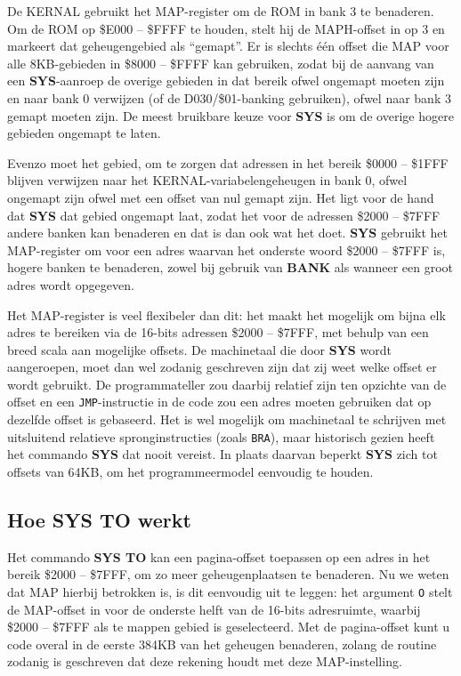 De KERNAL gebruikt het MAP-register om de ROM in bank 3 te benaderen. Om de ROM op \$E000 -- \$FFFF te houden, stelt hij de MAPH-offset in op 3 en markeert dat geheugengebied als ``gemapt''. Er is slechts één offset die MAP voor alle 8KB-gebieden in \$8000 -- \$FFFF kan gebruiken, zodat bij de aanvang van een {\bf SYS}-aanroep de overige gebieden in dat bereik ofwel ongemapt moeten zijn en naar bank 0 verwijzen (of de D030/\$01-banking gebruiken), ofwel naar bank 3 gemapt moeten zijn. De meest bruikbare keuze voor {\bf SYS} is om de overige hogere gebieden ongemapt te laten.

Evenzo moet het gebied, om te zorgen dat adressen in het bereik \$0000 -- \$1FFF blijven verwijzen naar het KERNAL-variabelengeheugen in bank 0, ofwel ongemapt zijn ofwel met een offset van nul gemapt zijn. Het ligt voor de hand dat {\bf SYS} dat gebied ongemapt laat, zodat het voor de adressen \$2000 -- \$7FFF andere banken kan benaderen en dat is dan ook wat het doet. {\bf SYS} gebruikt het MAP-register om voor een adres waarvan het onderste woord \$2000 -- \$7FFF is, hogere banken te benaderen, zowel bij gebruik van {\bf BANK} als wanneer een groot adres wordt opgegeven.

Het MAP-register is veel flexibeler dan dit: het maakt het mogelijk om bijna elk adres te bereiken via de 16-bits adressen \$2000 -- \$7FFF, met behulp van een breed scala aan mogelijke offsets. De machinetaal die door {\bf SYS} wordt aangeroepen, moet dan wel zodanig geschreven zijn dat zij weet welke offset er wordt gebruikt. De programmateller zou daarbij relatief zijn ten opzichte van de offset en een {\tt JMP}-instructie in de code zou een adres moeten gebruiken dat op dezelfde offset is gebaseerd. Het is wel mogelijk om machinetaal te schrijven met uitsluitend relatieve spronginstructies (zoals {\tt BRA}), maar historisch gezien heeft het commando {\bf SYS} dat nooit vereist. In plaats daarvan beperkt {\bf SYS} zich tot offsets van 64KB, om het programmeermodel eenvoudig te houden.

\subsection{Hoe SYS TO werkt}

Het commando {\bf SYS TO} kan een pagina-offset toepassen op een adres in het bereik \$2000 -- \$7FFF, om zo meer geheugenplaatsen te benaderen. Nu we weten dat MAP hierbij betrokken is, is dit eenvoudig uit te leggen: het argument \texttt{O} stelt de MAP-offset in voor de onderste helft van de 16-bits adresruimte, waarbij \$2000 -- \$7FFF als te mappen gebied is geselecteerd. Met de pagina-offset kunt u code overal in de eerste 384KB van het geheugen benaderen, zolang de routine zodanig is geschreven dat deze rekening houdt met deze MAP-instelling.


